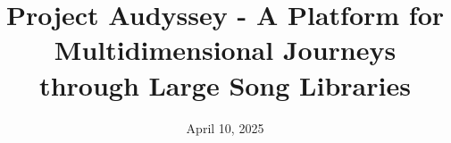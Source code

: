 \documentclass{src/ecsgdp}
\begin{document}
\frontmatter
\title{Project Audyssey - A Platform for Multidimensional Journeys through Large Song Libraries}
\date       {April 10, 2025}
\maketitle

\begin{abstract}

\end{abstract}



\tableofcontents
\listoffigures
\listoftables



\mainmatter






\end{document}

